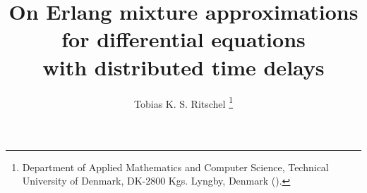 
\title{On Erlang mixture approximations for differential equations\\with distributed time delays}

\author{Tobias K. S. Ritschel%
	\thanks{Department of Applied Mathematics and Computer Science, Technical University of Denmark, DK-2800 Kgs. Lyngby, Denmark ().}
}

\ifpdf
{}
\fi
